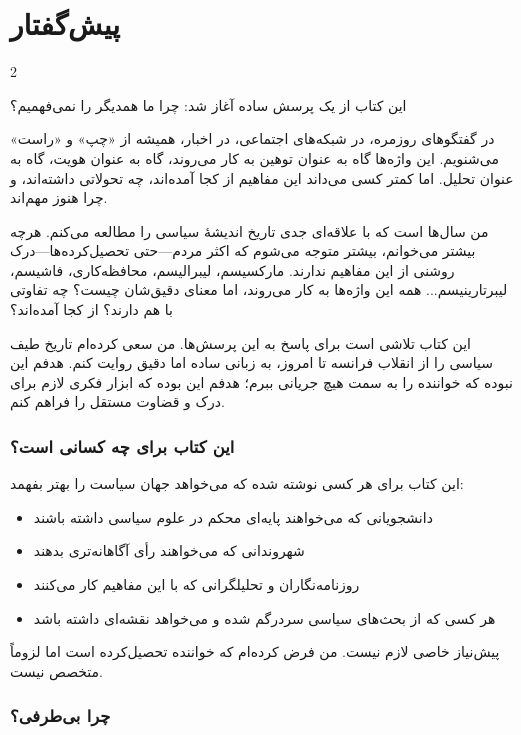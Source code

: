\chapter*{پیش‌گفتار}

\begin{multicols}{2}

این کتاب از یک پرسش ساده آغاز شد: چرا ما همدیگر را نمی‌فهمیم؟

در گفتگوهای روزمره، در شبکه‌های اجتماعی، در اخبار، همیشه از «چپ» و «راست» می‌شنویم. این واژه‌ها گاه به عنوان توهین به کار می‌روند، گاه به عنوان هویت، گاه به عنوان تحلیل. اما کمتر کسی می‌داند این مفاهیم از کجا آمده‌اند، چه تحولاتی داشته‌اند، و چرا هنوز مهم‌اند.

من سال‌ها است که با علاقه‌ای جدی تاریخ اندیشهٔ سیاسی را مطالعه می‌کنم. هرچه بیشتر می‌خوانم، بیشتر متوجه می‌شوم که اکثر مردم—حتی تحصیل‌کرده‌ها—درک روشنی از این مفاهیم ندارند. مارکسیسم، لیبرالیسم، محافظه‌کاری، فاشیسم، لیبرتارینیسم... همه این واژه‌ها به کار می‌روند، اما معنای دقیق‌شان چیست؟ چه تفاوتی با هم دارند؟ از کجا آمده‌اند؟

این کتاب تلاشی است برای پاسخ به این پرسش‌ها. من سعی کرده‌ام تاریخ طیف سیاسی را از انقلاب فرانسه تا امروز، به زبانی ساده اما دقیق روایت کنم. هدفم این نبوده که خواننده را به سمت هیچ جریانی ببرم؛ هدفم این بوده که ابزار فکری لازم برای درک و قضاوت مستقل را فراهم کنم.

\subsection*{این کتاب برای چه کسانی است؟}

این کتاب برای هر کسی نوشته شده که می‌خواهد جهان سیاست را بهتر بفهمد:

\begin{itemize}
    \item دانشجویانی که می‌خواهند پایه‌ای محکم در علوم سیاسی داشته باشند
    \item شهروندانی که می‌خواهند رأی آگاهانه‌تری بدهند
    \item روزنامه‌نگاران و تحلیلگرانی که با این مفاهیم کار می‌کنند
    \item هر کسی که از بحث‌های سیاسی سردرگم شده و می‌خواهد نقشه‌ای داشته باشد
\end{itemize}

پیش‌نیاز خاصی لازم نیست. من فرض کرده‌ام که خواننده تحصیل‌کرده است اما لزوماً متخصص نیست.

\subsection*{چرا بی‌طرفی؟}


\end{multicols}
